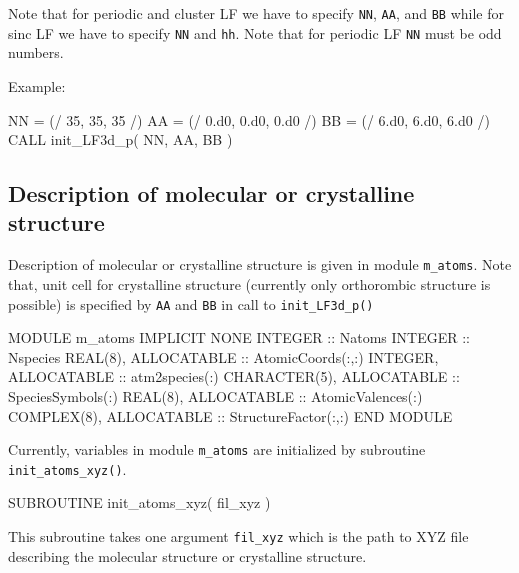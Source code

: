 Note that for periodic and cluster LF we have to specify {\tt NN}, {\tt AA}, and {\tt BB}
while for sinc LF we have to specify {\tt NN} and {\tt hh}.
Note that for periodic LF {\tt NN} must be odd numbers.

Example:
\begin{fortrancode}
NN = (/ 35, 35, 35 /)
AA = (/ 0.d0, 0.d0, 0.d0 /)
BB = (/ 6.d0, 6.d0, 6.d0 /)
CALL init_LF3d_p( NN, AA, BB )
\end{fortrancode}



\subsection{Description of molecular or crystalline structure}

Description of molecular or crystalline structure is given in module {\tt m\_atoms}.
Note that, unit cell for crystalline structure (currently only orthorombic structure is
possible) is specified by {\tt AA} and {\tt BB} in call to {\tt init\_LF3d\_p()}

\begin{fortrancode}
MODULE m_atoms
  IMPLICIT NONE 
  INTEGER :: Natoms
  INTEGER :: Nspecies
  REAL(8), ALLOCATABLE :: AtomicCoords(:,:)
  INTEGER, ALLOCATABLE :: atm2species(:)
  CHARACTER(5), ALLOCATABLE :: SpeciesSymbols(:)
  REAL(8), ALLOCATABLE :: AtomicValences(:)
  COMPLEX(8), ALLOCATABLE :: StructureFactor(:,:)
END MODULE 
\end{fortrancode}

Currently, variables in module {\tt m\_atoms} are initialized by
subroutine {\tt init\_atoms\_xyz()}.
\begin{fortrancode}
SUBROUTINE init_atoms_xyz( fil_xyz )
\end{fortrancode}
This subroutine takes one argument {\tt fil\_xyz} which is the path
to XYZ file describing the molecular structure or crystalline structure.



